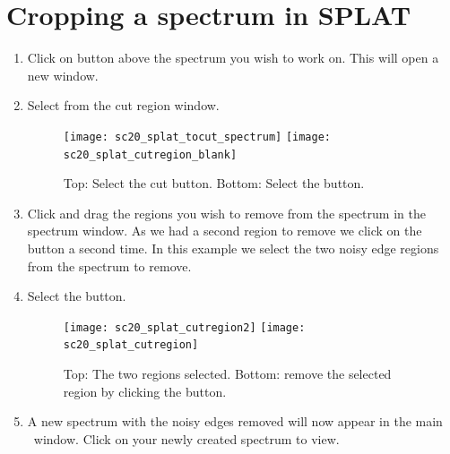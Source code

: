 \documentclass[11pt,oneside,chapters]{starlink}
\begin{document}
\section{Cropping a spectrum in SPLAT}
\label{sec:splat-crop}


\begin{enumerate}[label=(\textbf{\arabic*})]

\item Click on  button
above the spectrum you wish to work on. This will open a new window.


\item Select  from the cut region window.

\begin{figure}[h!]
\begin{center}
\texttt{[image: sc20\_splat\_tocut\_spectrum]}
\texttt{[image: sc20\_splat\_cutregion\_blank]}
\caption[Select the crop button in SPLAT.]{\label{fig:splat_crop1}
  Top: Select the cut button. Bottom: Select the  button.}
\end{center}
\end{figure}


\item Click and drag the regions you wish to remove from the
spectrum in the spectrum window. As we had a
second region to remove we click on the  button
a second time. In this example we select the two noisy edge regions from the
spectrum to remove.


\item Select the  button.

\begin{figure}[h!]
\begin{center}
\texttt{[image: sc20\_splat\_cutregion2]}
\texttt{[image: sc20\_splat\_cutregion]}
\caption[Selected regions for removal.]{\label{fig:splat_crop2}
  Top: The two regions selected. Bottom: remove the selected region
  by clicking the  button.}
\end{center}
\end{figure}


\item A new spectrum with the noisy edges removed will now appear
in the main \splat\ window. Click on your newly created spectrum
to view.


\end{enumerate}
\end{document}
